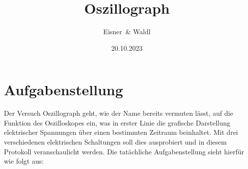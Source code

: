 \documentclass[12pt,a4paper,twoside]{article}
\begin{document}
\newcommand\laboratorynumber{2}
\title{Oszillograph}
\newcommand\supervisor{Ditlbacher, Harald}
\newcommand\groupnumber{42}

\newcommand\participantonelastname{Eisner}
\newcommand\participantonefirstname{Nico}
\newcommand\participantoneid{12214121}
\newcommand\participanttwolastname{Waldl}
\newcommand\participanttwofirstname{Philip}
\newcommand\participanttwoid{12214120}
\author{\participantonelastname \ \& \participanttwolastname}

\newcommand\degreeid{UB 033 678}
\newcommand\semester{23WS}
\date{20.10.2023}

\newcommand\coursetitle{Laborübungen 2: \\ Elektrizität, Magnetismus, Optik}

%



\tableofcontents
\newpage

\section{Aufgabenstellung} %

Der Versuch Oszillograph geht, wie der Name bereits vermuten lässt, auf die Funktion des Oszilloskopes ein, was in erster Linie die grafische Darstellung elektrischer Spannungen über einen bestimmten Zeitraum beinhaltet.
Mit drei verschiedenen elektrischen Schaltungen soll dies ausprobiert und in diesem Protokoll veranschaulicht werden. 
Die tatächliche Aufgabenstellung sieht hierfür wie folgt aus:
\end{document}
